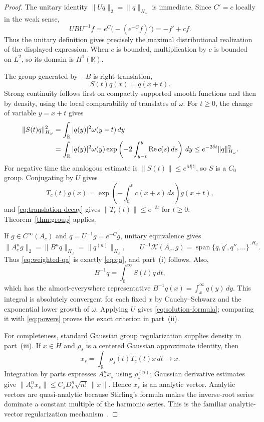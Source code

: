 \documentclass[11pt]{article}
\newcommand{\R}{\mathbb{R}}
\newcommand{\K}{\mathcal{K}}
\begin{document}
\begin{proof}
The unitary identity $\|Uq\|_2=\|q\|_{H_\omega}$ is immediate.  Since
$C'=c$ locally in the weak sense,
\[
 UBU^{-1}f=e^C\bigl(-(e^{-C}f)'\bigr)=-f'+cf.
\]
Thus the unitary definition gives precisely the maximal distributional
realization of the displayed expression.  When $c$ is bounded, multiplication
by $c$ is bounded on $L^2$, so its domain is $H^1(\R)$.

The group generated by $-B$ is right translation,
\[
 S(t)q(x)=q(x+t).
\]
Strong continuity follows first on compactly supported smooth functions and
then by density, using the local comparability of translates of $\omega$.
For $t\geq0$, the change of variable $y=x+t$ gives
\begin{align}
 \|S(t)q\|_{H_\omega}^2
 &=\int_\R |q(y)|^2\omega(y-t)\,dy\notag\\
 &=\int_\R |q(y)|^2\omega(y)
   \exp\left(-2\int_{y-t}^{y}\operatorname{Re}c(s)\,ds\right)\,dy
 \leq e^{-2\delta t}\|q\|_{H_\omega}^2.\label{eq:translation-decay}
\end{align}
For negative time the analogous estimate is
$\|S(t)\|\leq e^{M|t|}$, so $S$ is a $C_0$ group.  Conjugating by $U$ gives
\begin{equation}\label{eq:physical-group}
 T_c(t)g(x)=
 \exp\left(-\int_0^t c(x+s)\,ds\right)g(x+t),
\end{equation}
and \eqref{eq:translation-decay} gives
$\|T_c(t)\|\leq e^{-\delta t}$ for $t\geq0$.  Theorem~\ref{thm:group}
applies.

If $g\in C^\infty(A_c)$ and $q=U^{-1}g=e^{-C}g$, unitary equivalence gives
\begin{equation}\label{eq:powers}
 \|A_c^ng\|_2=\|B^nq\|_{H_\omega}=\|q^{(n)}\|_{H_\omega},
 \qquad
 U^{-1}\overline{\K(A_c,g)}
 =\overline{\operatorname{span}\{q,q',q'',\ldots\}}^{,H_\omega}.
\end{equation}
Thus \eqref{eq:weighted-qa} is exactly \eqref{eq:qa}, and part~(i) follows.
Also,
\[
 B^{-1}q=\int_0^\infty S(t)q\,dt,
\]
which has the almost-everywhere representative
$B^{-1}q(x)=\int_x^\infty q(y)\,dy$.  This integral is absolutely convergent
for each fixed $x$ by Cauchy--Schwarz and the exponential lower growth of
$\omega$.  Applying $U$ gives \eqref{eq:solution-formula}; comparing it with
\eqref{eq:powers} proves the exact criterion in part~(ii).

For completeness, standard Gaussian group regularization supplies density in
part~(iii).  If $x\in H$ and $\rho_s$ is a centered Gaussian approximate
identity, then
\[
 x_s=\int_\R \rho_s(t)T_c(t)x\,dt\longrightarrow x.
\]
Integration by parts expresses $A_c^nx_s$ using $\rho_s^{(n)}$; Gaussian
derivative estimates give
$\|A_c^nx_s\|\leq C_sD_s^n\sqrt{n!}\,\|x\|$.  Hence $x_s$ is an analytic
vector.  Analytic vectors are quasi-analytic because Stirling's formula makes
the inverse-root series dominate a constant multiple of the harmonic series.
This is the familiar analytic-vector regularization mechanism~\cite{Nelson}.
\end{proof}
\end{document}
